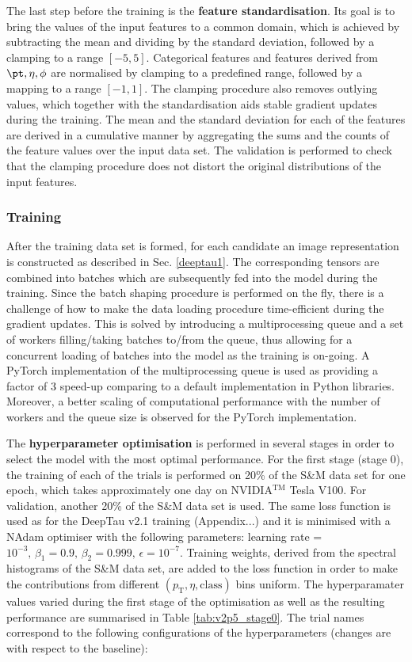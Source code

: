 The last step before the training is the \textbf{feature standardisation}. Its goal is to bring the values of the input features to a common domain, which is achieved by subtracting the mean and dividing by the standard deviation, followed by a clamping to a range $[-5,5]$. Categorical features and features derived from $\pt, \eta, \phi$ are normalised by clamping to a predefined range, followed by a mapping to a range $[-1,1]$. The clamping procedure also removes outlying values, which together with the standardisation aids stable gradient updates during the training. The mean and the standard deviation for each of the features are derived in a cumulative manner by aggregating the sums and the counts of the feature values over the input data set. The validation is performed to check that the clamping procedure does not distort the original distributions of the input features.

\subsubsection{Training}

After the training data set is formed, for each \tauh candidate an image representation is constructed as described in Sec. \ref{deeptau1}. The corresponding tensors are combined into batches which are subsequently fed into the model during the training. Since the batch shaping procedure is performed on the fly, there is a challenge of how to make the data loading procedure time-efficient during the gradient updates. This is solved by introducing a multiprocessing queue and a set of workers filling/taking batches to/from the queue, thus allowing for a concurrent loading of batches into the model as the training is on-going. A PyTorch \cite{NEURIPS2019_9015} implementation of the multiprocessing queue is used as providing a factor of 3 speed-up comparing to a default implementation in Python libraries. Moreover, a better scaling of computational performance with the number of workers and the queue size is observed for the PyTorch implementation. 

The \textbf{hyperparameter optimisation} is performed in several stages in order to select the model with the most optimal performance. For the first stage (stage 0), the training of each of the trials is performed on 20\% of the S\&M data set for one epoch, which takes approximately one day on NVIDIA$^\text{TM}$ Tesla V100. For validation, another 20\% of the S\&M data set is used. The same loss function is used as for the DeepTau v2.1 training (Appendix...) and it is minimised with a NAdam optimiser with the following parameters: learning rate = $10^{-3}, \, \beta_1 = 0.9, \, \beta_2 = 0.999, \,  \epsilon=10^{-7}$. Training weights, derived from the spectral histograms of the S\&M data set, are added to the loss function in order to make the contributions from different $(p_\text{T}, \eta, \text{class})$ bins uniform. The hyperparamater values varied during the first stage of the optimisation as well as the resulting performance are summarised in Table \ref{tab:v2p5_stage0}. The trial names correspond to the following configurations of the hyperparameters (changes are with respect to the baseline):

